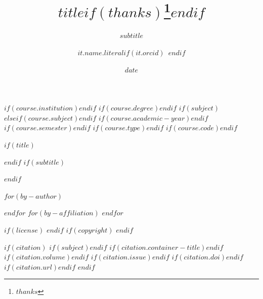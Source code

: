 

$if(course.institution)$$endif$
$if(course.degree)$$endif$
$if(subject)$$elseif(course.subject)$$endif$
$if(course.academic-year)$$endif$
$if(course.semester)$$endif$
$if(course.type)$$endif$
$if(course.code)$$endif$

$if(title)$
\title{$title$$if(thanks)$\thanks{$thanks$}$endif$}
$endif$
$if(subtitle)$
\subtitle{$subtitle$}
$endif$

$for(by-author)$
\author[$for(it.affiliations)$$it.number$$sep$,$endfor$]{$it.name.literal$$if(it.orcid)$~$endif$}
$endfor$
$for(by-affiliation)$
$endfor$
\date{$date$}

$if(license)$
$endif$
$if(copyright)$
$endif$

$if(citation)$
$if(subject)$$endif$
$if(citation.container-title)$$endif$
$if(citation.volume)$$endif$
$if(citation.issue)$$endif$
$if(citation.doi)$$endif$
$if(citation.url)$$endif$
$endif$
